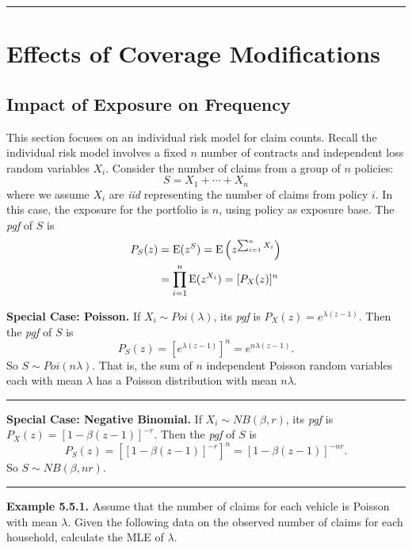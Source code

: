 \documentclass[]{book}
\theoremstyle{definition}
\theoremstyle{definition}
\theoremstyle{definition}
\theoremstyle{remark}
\begin{document}
\begin{center}\rule{0.5\linewidth}{\linethickness}\end{center}

\section{Effects of Coverage
Modifications}\label{effects-of-coverage-modifications}

\subsection{Impact of Exposure on
Frequency}\label{impact-of-exposure-on-frequency}

This section focuses on an individual risk model for claim counts.
Recall the individual risk model involves a fixed \(n\) number of
contracts and independent loss random variables \(X_i\). Consider the
number of claims from a group of \(n\) policies: \[S=X_1+\cdots+X_n\]
where we assume \(X_i\) are \emph{iid} representing the number of claims
from policy \(i\). In this case, the exposure for the portfolio is
\(n\), using policy as exposure base. The \emph{pgf} of \(S\) is
\[\begin{aligned}
P_{S}(z)&={\rm E}(z^S)={\rm E}\left(z^{\sum_{i=1}^nX_i}\right)\\
&=\prod_{i=1}^n{\rm E}(z^{X_i})=[P_X(z)]^n
\end{aligned}\]

\textbf{Special Case: Poisson.} If \(X_i\sim Poi(\lambda)\), its
\emph{pgf} is \(P_X(z)=e^{\lambda(z-1)}\). Then the \emph{pgf} of \(S\)
is \[P_{S}(z)=[e^{\lambda(z-1)}]^n=e^{n\lambda(z-1)}.\] So
\(S\sim Poi(n\lambda)\). That is, the sum of \(n\) independent Poisson
random variables each with mean \(\lambda\) has a Poisson distribution
with mean \(n\lambda\).

\begin{center}\rule{0.5\linewidth}{\linethickness}\end{center}

\textbf{Special Case: Negative Binomial.} If \(X_i\sim NB(\beta,r)\),
its \emph{pgf} is \(P_X(z)=[1-\beta(z-1)]^{-r}\). Then the \emph{pgf} of
\(S\) is \[P_{S}(z)=[[1-\beta(z-1)]^{-r}]^n=[1-\beta(z-1)]^{-nr}.\] So
\(S\sim NB(\beta,nr)\).

\begin{center}\rule{0.5\linewidth}{\linethickness}\end{center}

\textbf{Example 5.5.1.} Assume that the number of claims for each
vehicle is Poisson with mean \(\lambda\). Given the following data on
the observed number of claims for each household, calculate the MLE of
\(\lambda\).
\end{document}
